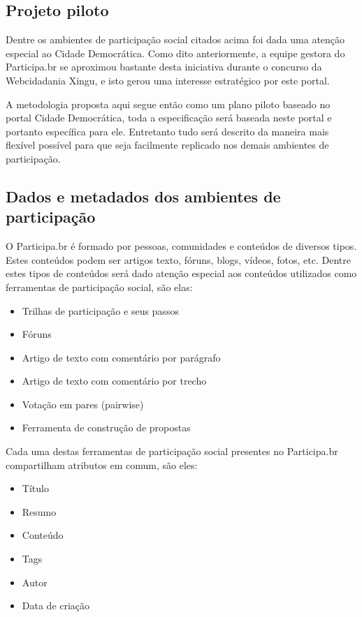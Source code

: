 \documentclass[12pt]{article}
\begin{document}
\subsection{Projeto piloto}

Dentre os ambientes de participação social citados acima foi dada uma atenção
especial ao Cidade Democrática. Como dito anteriormente, a equipe gestora do
Participa.br se aproximou bastante desta iniciativa durante o concurso da
Webcidadania Xingu, e isto gerou uma interesse estratégico por este portal.

A metodologia proposta aqui segue então como um plano piloto baseado no portal
Cidade Democrática, toda a especificação será baseada neste portal e portanto
específica para ele. Entretanto tudo será descrito da maneira mais flexível
possível para que seja facilmente replicado nos demais ambientes de
participação.

\subsection{Dados e metadados dos ambientes de participação}

O Participa.br é formado por pessoas, comunidades e conteúdos de diversos
tipos. Estes conteúdos podem ser artigos texto, fóruns, blogs, vídeos, fotos,
etc. Dentre estes tipos de conteúdos será dado atenção especial aos conteúdos
utilizados como ferramentas de participação social, são elas:

\begin{itemize}
  \item Trilhas de participação e seus passos
  \item Fóruns
  \item Artigo de texto com comentário por parágrafo
  \item Artigo de texto com comentário por trecho
  \item Votação em pares (pairwise)
  \item Ferramenta de construção de propostas
\end{itemize}

Cada uma destas ferramentas de participação social presentes no Participa.br
compartilham atributos em comum, são eles:

\begin{itemize}
  \item Título
  \item Resumo
  \item Conteúdo
  \item Tags
  \item Autor
  \item Data de criação
\end{itemize}
\end{document}
